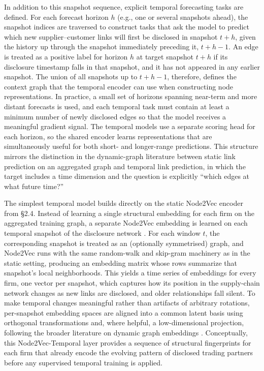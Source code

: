 In addition to this snapshot sequence, explicit temporal forecasting tasks are defined. For each forecast horizon \(h\) (e.g., one or several snapshots ahead), the snapshot indices are traversed to construct tasks that ask the model to predict which new supplier--customer links will first be disclosed in snapshot \(t+h\), given the history up through the snapshot immediately preceding it, \(t+h-1\). An edge is treated as a positive label for horizon \(h\) at target snapshot \(t+h\) if its disclosure timestamp falls in that snapshot, and it has not appeared in any earlier snapshot. The union of all snapshots up to \(t+h-1\), therefore, defines the context graph that the temporal encoder can use when constructing node representations. In practice, a small set of horizons spanning near-term and more distant forecasts is used, and each temporal task must contain at least a minimum number of newly disclosed edges so that the model receives a meaningful gradient signal. The temporal models use a separate scoring head for each horizon, so the shared encoder learns representations that are simultaneously useful for both short- and longer-range predictions. This structure mirrors the distinction in the dynamic-graph literature between static link prediction on an aggregated graph and temporal link prediction, in which the target includes a time dimension and the question is explicitly ``which edges at what future time?''

The simplest temporal model builds directly on the static Node2Vec encoder from \S2.4. Instead of learning a single structural embedding for each firm on the aggregated training graph, a separate Node2Vec embedding is learned on each temporal snapshot of the disclosure network \parencite{grover_node2vec_2016}. For each window \(t\), the corresponding snapshot is treated as an (optionally symmetrised) graph, and Node2Vec runs with the same random-walk and skip-gram machinery as in the static setting, producing an embedding matrix whose rows summarize that snapshot's local neighborhoods. This yields a time series of embeddings for every firm, one vector per snapshot, which captures how its position in the supply-chain network changes as new links are disclosed, and older relationships fall silent. To make temporal changes meaningful rather than artifacts of arbitrary rotations, per-snapshot embedding spaces are aligned into a common latent basis using orthogonal transformations and, where helpful, a low-dimensional projection, following the broader literature on dynamic graph embeddings \parencite{goyal_dyngraph2vec_2020,hamilton_diachronic_2016}. Conceptually, this Node2Vec-Temporal layer provides a sequence of structural fingerprints for each firm that already encode the evolving pattern of disclosed trading partners before any supervised temporal training is applied.

